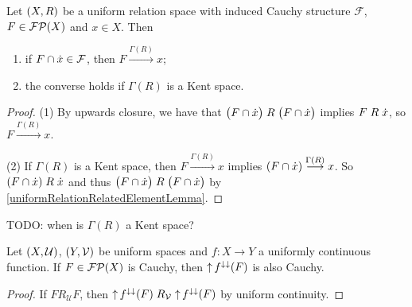 \begin{lemma}
Let $\sSet{X,R}$ be a uniform relation space with induced Cauchy structure $\mathcal{F}$, $F\in \operatorname{\mathcal{FP}}(X)$ and $x\in X$. Then
\begin{enumerate}
\item if $F\cap\dot{x} \in \mathcal{F}$, then $F\overset{\Gamma(R)}{\longrightarrow} x$;
\item the converse holds if $\Gamma(R)$ is a Kent space.
\end{enumerate}
\end{lemma}
\begin{proof}
(1) By upwards closure, we have that $\big(F\cap \dot{x}\big)\mathrel{R}\big(F\cap \dot{x}\big)$ implies $F\mathrel{R}\dot{x}$, so $F\overset{\Gamma(R)}{\longrightarrow} x$.

(2) If $\Gamma(R)$ is a Kent space, then $F\overset{\Gamma(R)}{\longrightarrow} x$ implies $(F\cap\dot{x})\overset{\Gamma(R)}{\longrightarrow} x$. So $(F\cap\dot{x})\mathrel{R}\dot{x}$ and thus $\big(F\cap \dot{x}\big)\mathrel{R}\big(F\cap \dot{x}\big)$ by \ref{uniformRelationRelatedElementLemma}.
\end{proof}
TODO: when is $\Gamma(R)$ a Kent space?

\begin{lemma} \label{continuousImageOfCauchy}
Let $\sSet{X,\mathcal{U}}$, $\sSet{Y,\mathcal{V}}$ be uniform spaces and $f: X\to Y$ a uniformly continuous function. If $F\in\operatorname{\mathcal{FP}}(X)$ is Cauchy, then $\operatorname{\uparrow} f^{\downarrow\downarrow}(F)$ is also Cauchy.
\end{lemma}
\begin{proof}
If $F\mathrel{R_\mathcal{U}}F$, then $\operatorname{\uparrow} f^{\downarrow\downarrow}(F)\mathrel{R_\mathcal{V}}\operatorname{\uparrow} f^{\downarrow\downarrow}(F)$ by uniform continuity.
\end{proof}

